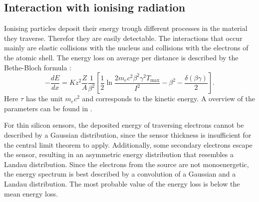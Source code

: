 \subsection{Interaction with ionising radiation}
Ionising particles deposit their energy trough different processes in the material they traverse.
Therefor they are easily detectable.
The interactions that occur mainly are elastic collisions with the nucleus and collisions with the electrons of the atomic shell.
The energy loss on average per distance is described by the Bethe-Bloch formula \cite{Vorlage}:
\begin{equation}
	-\frac{dE}{dx} = K z^2 \frac{Z}{A} \frac{1}{\beta^2} \left[ \frac{1}{2} \ln{\frac{2 m_e c^2 \beta^2 \gamma^2 T_\text{max}}{I^2}} - \beta^2 - \frac{\delta(\beta\gamma)}{2} \right].
\end{equation} 
Here $\tau$ has the unit $m_ec^2$ and corresponds to the kinetic energy.
A overview of the parameters can be found in \cite{Vorlage}.

For thin silicon sensors, 
the deposited energy of traversing electrons cannot be described by a Gaussian distribution, 
since the sensor thickness is insufficient for the central limit theorem to apply. 
Additionally, 
some secondary electrons escape the sensor, 
resulting in an asymmetric energy distribution that resembles a Landau distribution. 
Since the electrons from the source are not monoenergetic,
the energy spectrum is best described by a convolution of a Gaussian and a Landau distribution. 
The most probable value of the energy loss is below the mean energy loss. 





